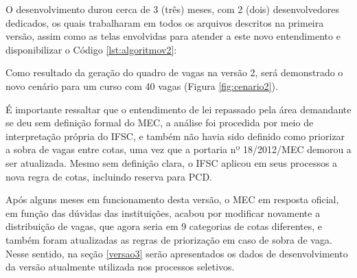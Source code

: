 \newpage
O desenvolvimento durou cerca de 3 (três) meses, com 2 (dois) desenvolvedores dedicados, os quais trabalharam em todos os arquivos descritos na primeira versão, assim como as telas envolvidas para atender a este novo entendimento e disponibilizar o Código \ref{lst:algoritmov2}:




Como resultado da geração do quadro de vagas na versão 2, será demonstrado o novo cenário para um curso com 40 vagas (Figura \ref{fig:cenario2}).



É importante ressaltar que o entendimento de lei repassado pela área demandante se deu sem definição formal do \gls{MEC}, a análise foi procedida por meio de interpretação própria do \gls{IFSC}, e também não havia sido definido como priorizar a sobra de vagas entre cotas, uma vez que a portaria nº 18/2012/MEC  demorou a ser atualizada. Mesmo sem definição clara, o \gls{IFSC} aplicou em seus processos a nova regra de cotas, incluindo reserva para \gls{PCD}.

Após alguns meses em funcionamento desta versão, o \gls{MEC} em resposta oficial, em função das dúvidas das instituições, acabou por modificar novamente a distribuição de vagas, que agora seria em 9 categorias de cotas diferentes, e também foram atualizadas as regras de priorização em caso de sobra de vaga. Nesse sentido, na seção \ref{versao3} serão apresentados os dados de desenvolvimento da versão atualmente utilizada nos processos seletivos.